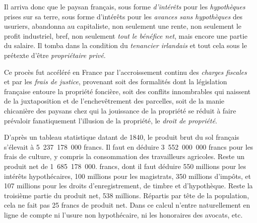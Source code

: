 \documentclass[french,twoside]{book} %
\begin{document}
Il arriva donc que le paysan français, sous forme \emph{d’intérêts} pour les \emph{hypothèques} prises sur sa terre, sous forme d’intérêts pour les \emph{avances sans hypothèques} des usuriers, abandonna au capitaliste, non seulement une rente, non seulement le profit industriel, bref, non seulement \emph{tout le bénéfice net}, mais encore une partie du salaire. Il tomba dans la condition du \emph{tenancier irlandais} et tout cela sous le prétexte d’être \emph{propriétaire privé}.\par
Ce procès fut accéléré en France par l’accroissement continu des \emph{charges fiscales} et par les \emph{frais de justice}, provenant soit des formalités dont la législation française entoure la propriété foncière, soit des conflits innombrables qui naissent de la juxtaposition et de l’enchevêtrement des parcelles, soit de la manie chicanière des paysans chez qui la jouissance de la propriété se réduit à faire prévaloir fanatiquement l’illusion de la propriété, le \emph{droit de propriété}.\par
D’après un tableau statistique datant de 1840, le produit brut du sol français s’élevait à 5 237 178 000 francs. Il faut en déduire 3 552 000 000 francs pour les frais de culture, y compris la consommation des travailleurs agricoles. Reste un produit net de 1 685 178 000. francs, dont il faut déduire 550 millions pour les intérêts hypothécaires, 100 millions pour les magistrats, 350 millions d’impôts, et 107 millions pour les droits d’enregistrement, de timbre et d’hypothèque. Reste la troisième partie du produit net, 538 millions. Répartis par tête de la population, cela ne fait pas 25 francs de produit net. Dans ce calcul n’entre naturellement en ligne de compte ni l’usure non hypothécaire, ni les honoraires des avocats, etc.\par
\end{document}
